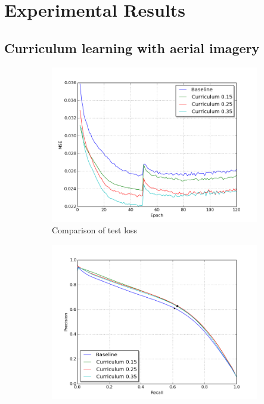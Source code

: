 \section{Experimental Results}
\label{sec:experimentalResults}

\subsection{Curriculum learning with aerial imagery}
\label{sec:results_curriculum_learning_aerial_imagery}

\begin{figure}[!ht]
\begin{subfigure}{0.48\textwidth}
\includegraphics[width=\linewidth]{figs/E1/E1-lc.png}
\caption{Comparison of test loss} \label{fig:E1_curr_norway_loss}
\end{subfigure}
\hspace*{\fill} %
\begin{subfigure}{0.48\textwidth}
\includegraphics[width=\linewidth]{figs/E1/E1-pr.png}

\end{subfigure}
\end{figure}
